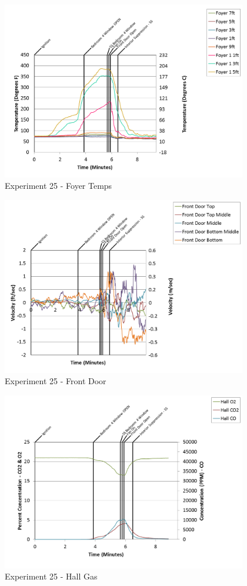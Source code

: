 \documentclass{article}
\begin{document}
\begin{appendices}
\begin{figure}[h!]
	\centering
	\includegraphics[height=3.05in]{0_Images/Results_Charts/Exp_25_Charts/FoyerTemps.png}
	\caption{Experiment 25 - Foyer Temps}
\end{figure}

\clearpage

\begin{figure}[h!]
	\centering
	\includegraphics[height=3.05in]{0_Images/Results_Charts/Exp_25_Charts/FrontDoor.png}
	\caption{Experiment 25 - Front Door}
\end{figure}


\begin{figure}[h!]
	\centering
	\includegraphics[height=3.05in]{0_Images/Results_Charts/Exp_25_Charts/HallGas.png}
	\caption{Experiment 25 - Hall Gas}
\end{figure}


\end{appendices}
\end{document}
